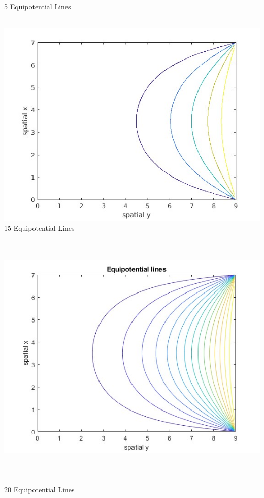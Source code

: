 \documentclass{amsart}
\begin{document}
    \caption{5 Equipotential Lines }
	\label{5 Equipotential Lines }\\
	\includegraphics[scale=0.2]{EL5}\\
    \caption{15 Equipotential Lines }\\
	\label{15 Equipotential Lines }\\
	\includegraphics[scale=0.65]{EL15}\\ \\ \\ \\
    \caption{20 Equipotential Lines }\\
	\label{20 Equipotential Lines }\\
\end{document}
